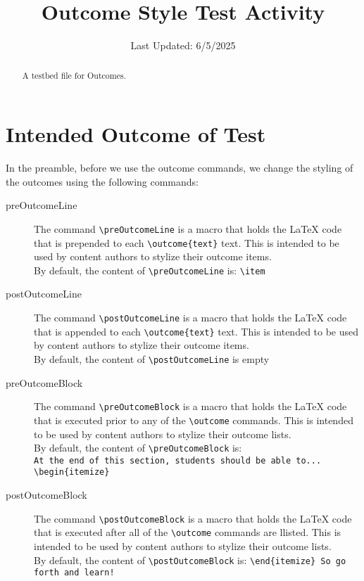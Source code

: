 \documentclass{ximera}
\title{Outcome Style Test Activity}
\date{Last Updated: 6/5/2025}
\renewcommand{\preOutcomeLine}{This marks the beginning of the outcome line. }
\renewcommand{\postOutcomeLine}{ This marks the end of Outcome Line.\\}
\renewcommand{\preOutcomeBlock}{This is the beginning of a boring block of outcomes. No itemize.\\}
\renewcommand{\postOutcomeBlock}{End of Block... a boring block without any itemize.\\}
\begin{document}
\begin{abstract}
    A testbed file for Outcomes.
\end{abstract}
\maketitle

\section{Intended Outcome of Test}

In the preamble, before we use the outcome commands, we change the styling of the outcomes using the following commands:
\begin{description}
    \item[preOutcomeLine] The command \verb|\preOutcomeLine| is a macro that holds the LaTeX code that is prepended to each \verb|\outcome{text}| text. 
            This is intended to be used by content authors to stylize their outcome items.\\
            By default, the content of \verb|\preOutcomeLine| is: \verb|\item |
    \item[postOutcomeLine] The command \verb|\postOutcomeLine| is a macro that holds the LaTeX code that is appended to each \verb|\outcome{text}| text. 
            This is intended to be used by content authors to stylize their outcome items.\\
            By default, the content of \verb|\postOutcomeLine| is empty
    \item[preOutcomeBlock] The command \verb|\preOutcomeBlock| is a macro that holds the LaTeX code that is executed prior to any of the \verb|\outcome| commands. 
            This is intended to be used by content authors to stylize their outcome lists.\\
            By default, the content of \verb|\preOutcomeBlock| is: \\
            \verb|At the end of this section, students should be able to... \begin{itemize}|
    \item[postOutcomeBlock] The command \verb|\postOutcomeBlock| is a macro that holds the LaTeX code that is executed after all of the \verb|\outcome| commands are llisted. 
            This is intended to be used by content authors to stylize their outcome lists.\\
            By default, the content of \verb|\postOutcomeBlock| is: \verb|\end{itemize} So go forth and learn!|

\end{description}
\end{document}
